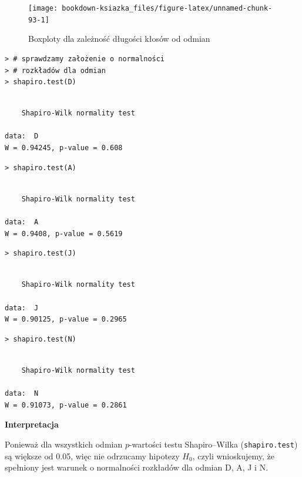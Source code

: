\documentclass[12pt,B5paper,]{book}
\begin{document}
\begin{figure}[H]

{\centering \texttt{[image: bookdown-ksiazka\_files/figure-latex/unnamed-chunk-93-1]} 

}

\caption{Boxploty dla zależność długości kłosów od odmian}\label{fig:unnamed-chunk-93}
\end{figure}

\begin{verbatim}
> # sprawdzamy założenie o normalności
> # rozkładów dla odmian
> shapiro.test(D)
\end{verbatim}

\begin{verbatim}

    Shapiro-Wilk normality test

data:  D
W = 0.94245, p-value = 0.608
\end{verbatim}

\begin{verbatim}
> shapiro.test(A)
\end{verbatim}

\begin{verbatim}

    Shapiro-Wilk normality test

data:  A
W = 0.9408, p-value = 0.5619
\end{verbatim}

\begin{verbatim}
> shapiro.test(J)
\end{verbatim}

\begin{verbatim}

    Shapiro-Wilk normality test

data:  J
W = 0.90125, p-value = 0.2965
\end{verbatim}

\begin{verbatim}
> shapiro.test(N)
\end{verbatim}

\begin{verbatim}

    Shapiro-Wilk normality test

data:  N
W = 0.91073, p-value = 0.2861
\end{verbatim}

\vspace{0.8cm}

\textbf{Interpretacja}

Ponieważ dla wszystkich odmian \(p\)-wartości testu Shapiro--Wilka
(\texttt{shapiro.test}) są większe od 0.05, więc nie odrzucamy hipotezy
\(H_0\), czyli wnioskujemy, że spełniony jest warunek o normalności
rozkładów dla odmian D, A, J i N.
\end{document}
